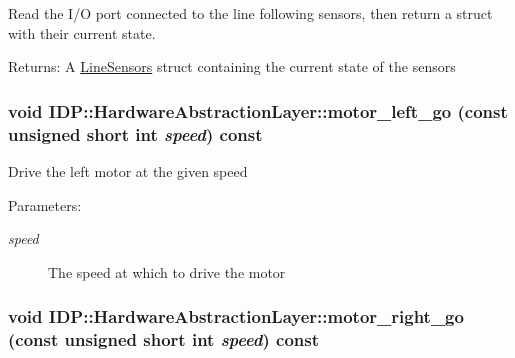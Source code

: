 Read the I/O port connected to the line following sensors, then return a struct with their current state. \begin{Desc}
\item[Returns:]A \hyperlink{structIDP_1_1LineSensors}{LineSensors} struct containing the current state of the sensors \end{Desc}
\hypertarget{classIDP_1_1HardwareAbstractionLayer_2ff5baa231a7796845a7cf2fb041c0c0}{
\subsubsection[{motor\_\-left\_\-go}]{\setlength{\rightskip}{0pt plus 5cm}void IDP::HardwareAbstractionLayer::motor\_\-left\_\-go (const unsigned short int {\em speed}) const}}
\label{classIDP_1_1HardwareAbstractionLayer_2ff5baa231a7796845a7cf2fb041c0c0}


Drive the left motor at the given speed \begin{Desc}
\item[Parameters:]
\begin{description}
\item[{\em speed}]The speed at which to drive the motor \end{description}
\end{Desc}
\hypertarget{classIDP_1_1HardwareAbstractionLayer_bdee21a9673a458f2a91d240369e08a1}{
\subsubsection[{motor\_\-right\_\-go}]{\setlength{\rightskip}{0pt plus 5cm}void IDP::HardwareAbstractionLayer::motor\_\-right\_\-go (const unsigned short int {\em speed}) const}}
\label{classIDP_1_1HardwareAbstractionLayer_bdee21a9673a458f2a91d240369e08a1}


